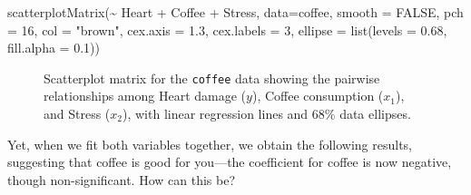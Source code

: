 \documentclass[
  letterpaper,
  10pt,
  krantz2]{krantz}
\makeatletter
\newenvironment{Shaded}{\begin{snugshade}}{\end{snugshade}}
\newcommand{\AttributeTok}[1]{\textcolor[rgb]{0.40,0.45,0.13}{#1}}
\newcommand{\ConstantTok}[1]{\textcolor[rgb]{0.56,0.35,0.01}{#1}}
\newcommand{\DecValTok}[1]{\textcolor[rgb]{0.68,0.00,0.00}{#1}}
\newcommand{\FloatTok}[1]{\textcolor[rgb]{0.68,0.00,0.00}{#1}}
\newcommand{\FunctionTok}[1]{\textcolor[rgb]{0.28,0.35,0.67}{#1}}
\newcommand{\NormalTok}[1]{\textcolor[rgb]{0.00,0.23,0.31}{#1}}
\newcommand{\SpecialCharTok}[1]{\textcolor[rgb]{0.37,0.37,0.37}{#1}}
\newcommand{\StringTok}[1]{\textcolor[rgb]{0.13,0.47,0.30}{#1}}
\newenvironment{kframe}{%
  \medskip{}
  \setlength{\fboxsep}{.8em}
  \def\at@end@of@kframe{}%
  \ifinner\ifhmode%
  \def\at@end@of@kframe{\end{minipage}}%
  \begin{minipage}{\columnwidth}%
  \fi\fi%
  \def\FrameCommand##1{\hskip\@totalleftmargin \hskip-\fboxsep
  \colorbox{shadecolor}{##1}\hskip-\fboxsep
      \hskip-\linewidth \hskip-\@totalleftmargin \hskip\columnwidth}%
  \MakeFramed {\advance\hsize-\width
    \@totalleftmargin\z@ \linewidth\hsize
    \@setminipage}}%
{\par\unskip\endMakeFramed%
  \at@end@of@kframe}
\renewenvironment{Shaded}{\begin{kframe}}{\end{kframe}}
\makeatother
\begin{document}
\begin{Shaded}
\begin{Highlighting}[]
\FunctionTok{scatterplotMatrix}\NormalTok{(}\SpecialCharTok{\textasciitilde{}}\NormalTok{ Heart }\SpecialCharTok{+}\NormalTok{ Coffee }\SpecialCharTok{+}\NormalTok{ Stress, }\AttributeTok{data=}\NormalTok{coffee,}
    \AttributeTok{smooth =} \ConstantTok{FALSE}\NormalTok{,}
    \AttributeTok{pch =} \DecValTok{16}\NormalTok{, }\AttributeTok{col =} \StringTok{"brown"}\NormalTok{,}
    \AttributeTok{cex.axis =} \FloatTok{1.3}\NormalTok{, }\AttributeTok{cex.labels =} \DecValTok{3}\NormalTok{,}
    \AttributeTok{ellipse =} \FunctionTok{list}\NormalTok{(}\AttributeTok{levels =} \FloatTok{0.68}\NormalTok{, }\AttributeTok{fill.alpha =} \FloatTok{0.1}\NormalTok{))}
\end{Highlighting}
\end{Shaded}

\begin{figure}


\caption{\label{fig-coffee-scatmat}Scatterplot matrix for the
\texttt{coffee} data showing the pairwise relationships among Heart
damage (\(y\)), Coffee consumption (\(x_1\)), and Stress (\(x_2\)), with
linear regression lines and 68\% data ellipses.}

\end{figure}%

Yet, when we fit both variables together, we obtain the following
results, suggesting that coffee is good for you---the coefficient for
coffee is now negative, though non-significant. How can this be?
\end{document}
